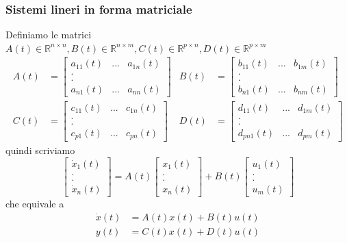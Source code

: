 \documentclass{article}
\numberwithin{equation}{subsection}
\begin{document}
\subsubsection{Sistemi lineri in forma matriciale}
Definiamo le matrici $A(t) \in \mathbb{R}^{n \times n} , B(t) \in \mathbb{R}^{n \times m} , C(t) \in \mathbb{R}^{p \times n} , D(t) \in \mathbb{R}^{p \times m}$
\begin{align*}
    A(t) &= \begin{bmatrix}
        a_{11}(t) & ... & a_{1n}(t)\\
        .\\
        .\\
        a_{n1}(t) & ... & a_{nn}(t)
    \end{bmatrix}
    &
    B(t) &= \begin{bmatrix}
        b_{11}(t) & ... & b_{1m}(t)\\
        .\\
        .\\
        b_{n1}(t) & ... & b_{nm}(t)
    \end{bmatrix}\\
    C(t) &= \begin{bmatrix}
        c_{11}(t) & ... & c_{1n}(t)\\
        .\\
        .\\
        c_{p1}(t) & ... & c_{pn}(t)
    \end{bmatrix}
    &
    D(t) &= \begin{bmatrix}
        d_{11}(t) & ... & d_{1m}(t)\\
        .\\
        .\\
        d_{pn1}(t) & ... & d_{pm}(t)
    \end{bmatrix}
\end{align*}
quindi scriviamo
\begin{equation}
    \begin{bmatrix}
        \dot x_1(t)\\
        .\\
        .\\
        \dot x_n(t)
    \end{bmatrix}
    = A(t)
    \begin{bmatrix}
        x_1(t)\\
        .\\
        .\\
        x_n(t)
    \end{bmatrix}
    + B(t)
    \begin{bmatrix}
        u_1(t)\\
        .\\
        .\\
        u_m(t)
    \end{bmatrix}
\end{equation}
che equivale a 
\begin{align*}
    \dot x(t) &= A(t) x(t) + B(t) u(t)\\
    y(t) &= C(t)x(t) + D(t) u(t)
\end{align*}
\end{document}
